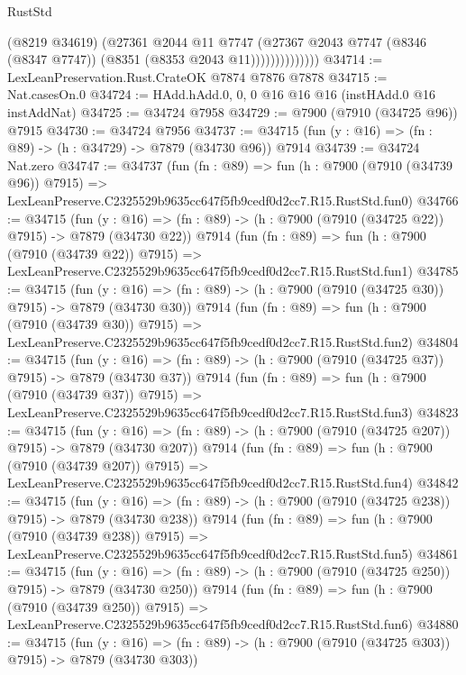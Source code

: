 \begin{lexlean}{RustStd}
\begin{coremodule}
                        (@8219 @34619)
                        (@27361
                          @2044
                          @11
                          @7747
                          (@27367
                            @2043
                            @7747
                            (@8346 (@8347 @7747))
                            (@8351 (@8353 @2043 @11))))))))))))))
@34714 := LexLeanPreservation.Rust.CrateOK @7874 @7876 @7878
@34715 := Nat.casesOn.{0}
@34724 := HAdd.hAdd.{0, 0, 0} @16 @16 @16 (instHAdd.{0} @16 instAddNat)
@34725 := @34724 @7958
@34729 := @7900 (@7910 (@34725 @96)) @7915
@34730 := @34724 @7956
@34737 := @34715 (fun (y : @16) => (fn : @89) -> (h : @34729) -> @7879 (@34730 @96)) @7914
@34739 := @34724 Nat.zero
@34747 := @34737
    (fun (fn : @89) =>
    fun (h : @7900 (@7910 (@34739 @96)) @7915) =>
    LexLeanPreserve.C2325529b9635cc647f5fb9cedf0d2cc7.R15.RustStd.fun0)
@34766 := @34715
    (fun (y : @16) => (fn : @89) -> (h : @7900 (@7910 (@34725 @22)) @7915) -> @7879 (@34730 @22))
    @7914
    (fun (fn : @89) =>
    fun (h : @7900 (@7910 (@34739 @22)) @7915) =>
    LexLeanPreserve.C2325529b9635cc647f5fb9cedf0d2cc7.R15.RustStd.fun1)
@34785 := @34715
    (fun (y : @16) => (fn : @89) -> (h : @7900 (@7910 (@34725 @30)) @7915) -> @7879 (@34730 @30))
    @7914
    (fun (fn : @89) =>
    fun (h : @7900 (@7910 (@34739 @30)) @7915) =>
    LexLeanPreserve.C2325529b9635cc647f5fb9cedf0d2cc7.R15.RustStd.fun2)
@34804 := @34715
    (fun (y : @16) => (fn : @89) -> (h : @7900 (@7910 (@34725 @37)) @7915) -> @7879 (@34730 @37))
    @7914
    (fun (fn : @89) =>
    fun (h : @7900 (@7910 (@34739 @37)) @7915) =>
    LexLeanPreserve.C2325529b9635cc647f5fb9cedf0d2cc7.R15.RustStd.fun3)
@34823 := @34715
    (fun (y : @16) => (fn : @89) -> (h : @7900 (@7910 (@34725 @207)) @7915) -> @7879 (@34730 @207))
    @7914
    (fun (fn : @89) =>
    fun (h : @7900 (@7910 (@34739 @207)) @7915) =>
    LexLeanPreserve.C2325529b9635cc647f5fb9cedf0d2cc7.R15.RustStd.fun4)
@34842 := @34715
    (fun (y : @16) => (fn : @89) -> (h : @7900 (@7910 (@34725 @238)) @7915) -> @7879 (@34730 @238))
    @7914
    (fun (fn : @89) =>
    fun (h : @7900 (@7910 (@34739 @238)) @7915) =>
    LexLeanPreserve.C2325529b9635cc647f5fb9cedf0d2cc7.R15.RustStd.fun5)
@34861 := @34715
    (fun (y : @16) => (fn : @89) -> (h : @7900 (@7910 (@34725 @250)) @7915) -> @7879 (@34730 @250))
    @7914
    (fun (fn : @89) =>
    fun (h : @7900 (@7910 (@34739 @250)) @7915) =>
    LexLeanPreserve.C2325529b9635cc647f5fb9cedf0d2cc7.R15.RustStd.fun6)
@34880 := @34715
    (fun (y : @16) => (fn : @89) -> (h : @7900 (@7910 (@34725 @303)) @7915) -> @7879 (@34730 @303))

\end{coremodule}
\end{lexlean}
